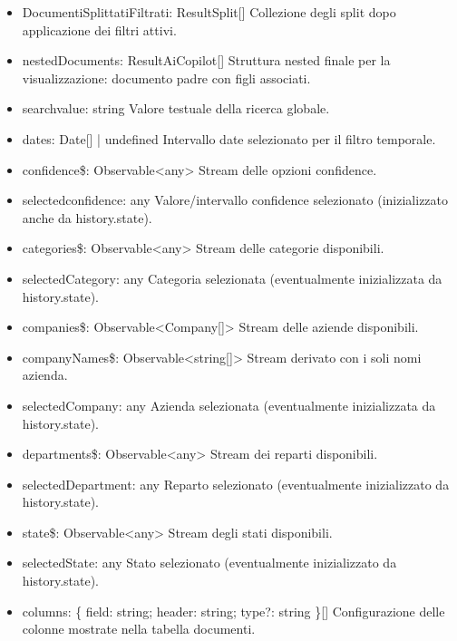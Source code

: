 \documentclass[a4paper,11pt]{article}
\begin{document}
\begin{itemize}[noitemsep, topsep=0pt]
\item DocumentiSplittatiFiltrati: ResultSplit[]
Collezione degli split dopo applicazione dei filtri attivi.

\item nestedDocuments: ResultAiCopilot[]
Struttura nested finale per la visualizzazione: documento padre con figli associati.

\item searchvalue: string
Valore testuale della ricerca globale.

\item dates: Date[] | undefined
Intervallo date selezionato per il filtro temporale.

\item confidence\$: Observable<any>
Stream delle opzioni confidence.

\item selectedconfidence: any
Valore/intervallo confidence selezionato (inizializzato anche da history.state).

\item categories\$: Observable<any>
Stream delle categorie disponibili.

\item selectedCategory: any
Categoria selezionata (eventualmente inizializzata da history.state).

\item companies\$: Observable<Company[]>
Stream delle aziende disponibili.

\item companyNames\$: Observable<string[]>
Stream derivato con i soli nomi azienda.

\item selectedCompany: any
Azienda selezionata (eventualmente inizializzata da history.state).

\item departments\$: Observable<any>
Stream dei reparti disponibili.

\item selectedDepartment: any
Reparto selezionato (eventualmente inizializzato da history.state).

\item state\$: Observable<any>
Stream degli stati disponibili.

\item selectedState: any
Stato selezionato (eventualmente inizializzato da history.state).

\item columns: \{ field: string; header: string; type?: string \}[]
Configurazione delle colonne mostrate nella tabella documenti.
\end{itemize}
\end{document}
